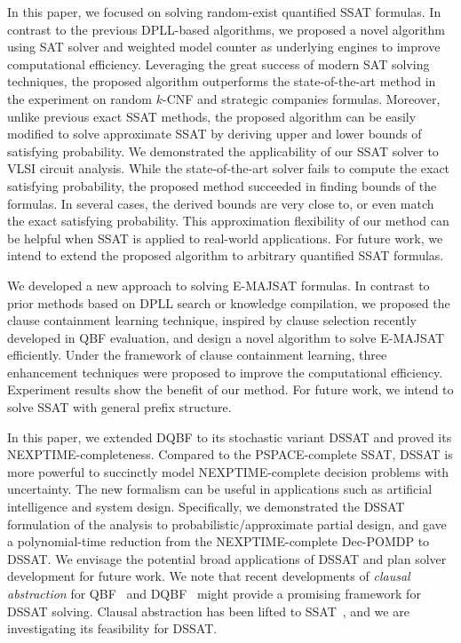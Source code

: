     In this paper, we focused on solving random-exist quantified SSAT formulas.
    In contrast to the previous DPLL-based algorithms, we proposed a novel algorithm using SAT solver and weighted model counter as underlying engines to improve computational efficiency.
    Leveraging the great success of modern SAT solving techniques, the proposed algorithm outperforms the state-of-the-art method in the experiment on random $k$-CNF and strategic companies formulas.
    Moreover, unlike previous exact SSAT methods, the proposed algorithm can be easily modified to solve approximate SSAT by deriving upper and lower bounds of satisfying probability.
    We demonstrated the applicability of our SSAT solver to VLSI circuit analysis.
    While the state-of-the-art solver fails to compute the exact satisfying probability, the proposed method succeeded in finding bounds of the formulas.
    In several cases, the derived bounds are very close to, or even match the exact satisfying probability.
    This approximation flexibility of our method can be helpful when SSAT is applied to real-world applications.
    For future work, we intend to extend the proposed algorithm to arbitrary quantified SSAT formulas.

    We developed a new approach to solving E-MAJSAT formulas. In contrast to prior methods based on DPLL search or knowledge compilation, we proposed the clause containment learning technique, inspired by clause selection recently developed in QBF evaluation, and design a novel algorithm to solve E-MAJSAT efficiently. Under the framework of clause containment learning, three enhancement techniques were proposed to improve the computational efficiency.
    Experiment results show the benefit of our method.
    For future work, we intend to solve SSAT with general prefix structure.

    In this paper, we extended DQBF to its stochastic variant DSSAT and proved its NEXPTIME-completeness.
    Compared to the PSPACE-complete SSAT, DSSAT is more powerful to succinctly model NEXPTIME-complete decision problems with uncertainty.
    The new formalism can be useful in applications such as artificial intelligence and system design.
    Specifically, we demonstrated the DSSAT formulation of the analysis to probabilistic/approximate partial design, and gave a polynomial-time reduction from the NEXPTIME-complete Dec-POMDP to DSSAT.
    We envisage the potential broad applications of DSSAT and plan solver development for future work.
    We note that recent developments of \textit{clausal abstraction} for QBF~\cite{JanotaM15,RabeT15} and DQBF~\cite{Tentrup19} might provide a promising framework for DSSAT solving.
    Clausal abstraction has been lifted to SSAT~\cite{ChenHJ21}, and we are investigating its feasibility for DSSAT.
\fi